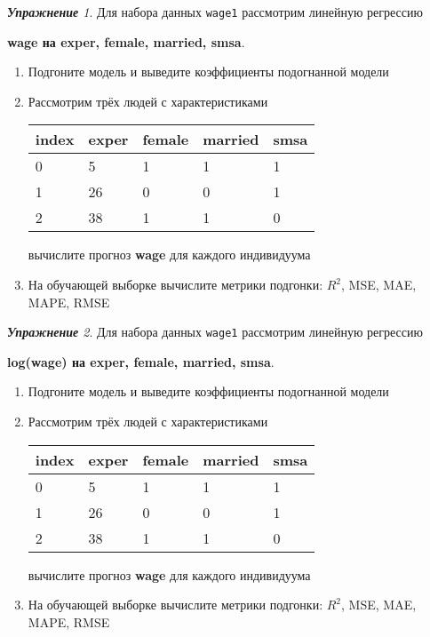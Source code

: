 \documentclass[a4,12pt]{article}
\theoremstyle{remark}
\newtheorem{exercise}{\textbf{Упражнение}}[section]
\begin{document}
\begin{exercise}
Для набора данных \texttt{wage1} рассмотрим линейную регрессию 
\begin{center}
	\textbf{wage на exper, female, married, smsa}.
\end{center}
\begin{enumerate}
	\item Подгоните модель и выведите коэффициенты подогнанной модели
	\item Рассмотрим трёх людей с характеристиками
	\begin{center}
		\begin{tabular}{|l||l|l|l|l|}\hline
			index & exper & female & married & smsa \\ \hline\hline
			0 & 5 & 1 & 1 & 1  \\
			1 & 26 & 0 & 0 & 1 \\
			2 & 38 & 1 & 1 & 0 \\ \hline
		\end{tabular}
	\end{center}
	вычислите прогноз \textbf{wage} для каждого индивидуума
	\item На обучающей выборке вычислите метрики подгонки: \(R^2\), 
	MSE, MAE, MAPE, RMSE
\end{enumerate}
\end{exercise}

\begin{exercise}
Для набора данных \texttt{wage1} рассмотрим линейную регрессию 
\begin{center}
	\textbf{log(wage) на exper, female, married, smsa}.
\end{center}
\begin{enumerate}
	\item Подгоните модель и выведите коэффициенты подогнанной модели
	\item Рассмотрим трёх людей с характеристиками
	\begin{center}
		\begin{tabular}{|l||l|l|l|l|}\hline
			index & exper & female & married & smsa \\ \hline\hline
			0 & 5 & 1 & 1 & 1  \\
			1 & 26 & 0 & 0 & 1 \\
			2 & 38 & 1 & 1 & 0 \\ \hline
		\end{tabular}
	\end{center}
	вычислите прогноз \textbf{wage} для каждого индивидуума
	\item На обучающей выборке вычислите метрики подгонки: \(R^2\), 
	MSE, MAE, MAPE, RMSE
\end{enumerate}
\end{exercise}
\end{document}
